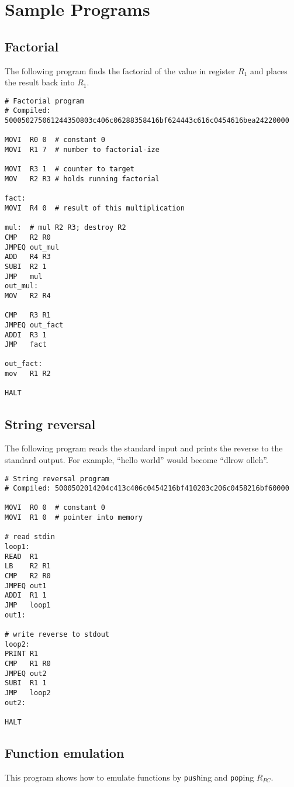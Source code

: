 \documentclass[12pt]{scrartcl}
\begin{document}
\section{Sample Programs}
\subsection{Factorial}
The following program finds the factorial of the value in register $R_1$ and places the result back into $R_1$.

\begin{lstlisting}
# Factorial program
# Compiled: 500050275061244350803c406c06288358416bf624443c616c0454616bea24220000

MOVI  R0 0  # constant 0
MOVI  R1 7  # number to factorial-ize

MOVI  R3 1  # counter to target
MOV   R2 R3 # holds running factorial

fact:
MOVI  R4 0  # result of this multiplication

mul:  # mul R2 R3; destroy R2
CMP   R2 R0
JMPEQ out_mul
ADD   R4 R3
SUBI  R2 1
JMP   mul
out_mul:
MOV   R2 R4

CMP   R3 R1
JMPEQ out_fact
ADDI  R3 1
JMP   fact

out_fact:
mov   R1 R2

HALT
\end{lstlisting}

\subsection{String reversal}
The following program reads the standard input and prints the reverse to the standard output. For example, ``hello world'' would become ``dlrow olleh''.

\begin{lstlisting}
# String reversal program
# Compiled: 5000502014204c413c406c0454216bf410203c206c0458216bf60000

MOVI  R0 0  # constant 0
MOVI  R1 0  # pointer into memory

# read stdin
loop1:
READ  R1
LB    R2 R1
CMP   R2 R0
JMPEQ out1
ADDI  R1 1
JMP   loop1
out1:

# write reverse to stdout
loop2:
PRINT R1
CMP   R1 R0
JMPEQ out2
SUBI  R1 1
JMP   loop2
out2:

HALT
\end{lstlisting}

\subsection{Function emulation}
This program shows how to emulate functions by \texttt{push}ing and \texttt{pop}ing $R_{PC}$.
\end{document}

